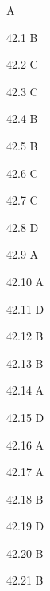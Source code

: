\begin{Solution}{42}
A
\end{Solution}
\begin{Solution}{42.{1}}
B
\end{Solution}
\begin{Solution}{42.{2}}
C
\end{Solution}
\begin{Solution}{42.{3}}
C
\end{Solution}
\begin{Solution}{42.{4}}
B
\end{Solution}
\begin{Solution}{42.{5}}
B
\end{Solution}
\begin{Solution}{42.{6}}
C
\end{Solution}
\begin{Solution}{42.{7}}
C
\end{Solution}
\begin{Solution}{42.{8}}
D
\end{Solution}
\begin{Solution}{42.{9}}
A
\end{Solution}
\begin{Solution}{42.{10}}
A
\end{Solution}
\begin{Solution}{42.{11}}
D
\end{Solution}
\begin{Solution}{42.{12}}
B
\end{Solution}
\begin{Solution}{42.{13}}
B
\end{Solution}
\begin{Solution}{42.{14}}
A
\end{Solution}
\begin{Solution}{42.{15}}
D
\end{Solution}
\begin{Solution}{42.{16}}
A
\end{Solution}
\begin{Solution}{42.{17}}
A
\end{Solution}
\begin{Solution}{42.{18}}
B
\end{Solution}
\begin{Solution}{42.{19}}
D
\end{Solution}
\begin{Solution}{42.{20}}
B
\end{Solution}
\begin{Solution}{42.{21}}
B
\end{Solution}
